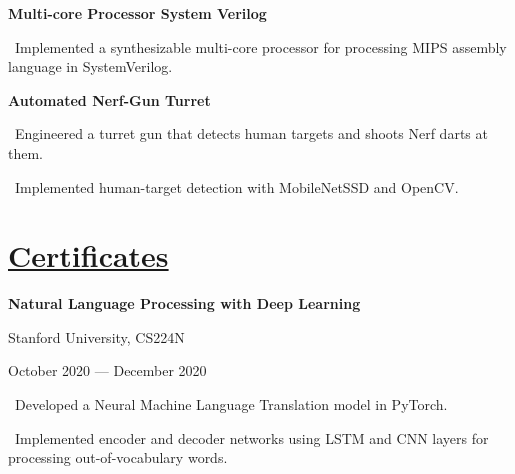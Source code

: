 \documentclass{article}
\begin{document}
\begin{minipage}[t][0pt]{8in\linewidth}
\begin{minipage}[t]{3.1in\linewidth\hspace{2.8em}}
    \small\bfseries\textrm{Multi-core Processor System Verilog}
    
    \vspace{0.3em}
    \small\mdseries
    \hspace{0em}\textasteriskcentered \, \mdseries\textrm{Implemented a synthesizable multi-core processor for processing MIPS assembly language in SystemVerilog.}
    \vspace{0.8em}
    
    \small\bfseries\textrm{Automated Nerf-Gun Turret}
    
    \vspace{0.3em}
    \small\mdseries
    \hspace{0em}\textasteriskcentered \, \mdseries\textrm Engineered a turret gun that detects human targets and shoots Nerf darts at them.

    \vspace{0.5em}
    \small\mdseries
    \hspace{0em}\textasteriskcentered \, \mdseries\textrm Implemented human-target detection with MobileNetSSD and OpenCV.

    \vspace{0.5em}     
    \section{\underline{Certificates}}
        \begin{minipage}[t]{3.3in\textwidth\hspace{0in}}    
            
            \vspace{-1.5em}        
            \mdseries\bfseries{Natural Language Processing with Deep Learning}
            
            \hspace{0.4em}\small\mdseries\textrm Stanford University, CS224N
            
            \hspace{0.4em}\small\mdseries\textrm October 2020 — December 2020
            
            \small\mdseries
            \vspace{0.4em}
            \hspace{1em}\textasteriskcentered \, \mdseries\textrm{Developed a Neural Machine Language Translation model in PyTorch.}
            
            \vspace{0.4em}
            \hspace{1em}\textasteriskcentered \, \mdseries\textrm{Implemented encoder and decoder networks using LSTM and CNN layers for processing out-of-vocabulary words.}
        \end{minipage}
    

\end{minipage}
\end{minipage}
\end{document}
